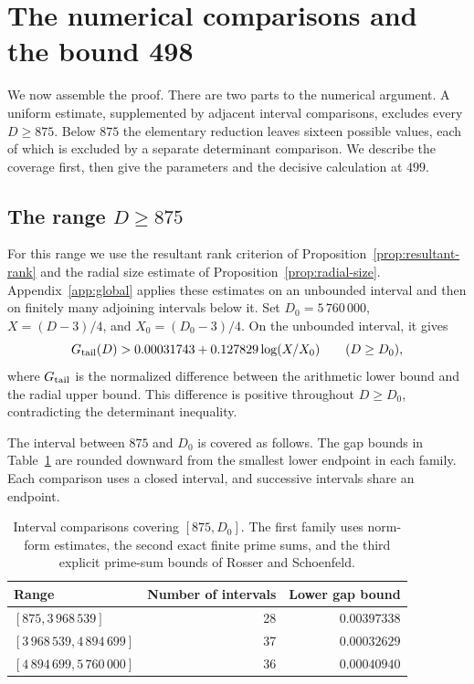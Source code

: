 \section{The numerical comparisons and the bound 498}\label{sec:completion}
We now assemble the proof. There are two parts to the numerical argument. A uniform estimate, supplemented by adjacent
interval comparisons, excludes every $D\geq875$. Below $875$ the elementary
reduction leaves sixteen possible values, each of which is excluded by a
separate determinant comparison. We describe the coverage first, then give
the parameters and the decisive calculation at $499$.

\subsection{The range \texorpdfstring{$D\geq875$}{D >= 875}}
For this range we use the resultant rank criterion of
Proposition~\ref{prop:resultant-rank} and the radial size estimate of
Proposition~\ref{prop:radial-size}. Appendix~\ref{app:global} applies these
estimates on an unbounded interval and then on finitely many adjoining
intervals below it. Set $D_0=5\,760\,000$, $X=(D-3)/4$, and
$X_0=(D_0-3)/4$. On the unbounded interval, it gives
\begin{equation}\label{eq:tail-gap}
 G_{\rm tail}(D)
 >0.00031743+0.127829\log(X/X_0)\qquad(D\geq D_0),
\end{equation}
where $G_{\rm tail}$ is the normalized difference between the arithmetic
lower bound and the radial upper bound. This difference is positive
throughout $D\geq D_0$, contradicting the determinant inequality.

The interval between $875$ and $D_0$ is covered as follows. The gap bounds in
Table~\ref{tab:coverage} are rounded downward from the smallest
lower endpoint in each family. Each comparison uses a closed interval, and
successive intervals share an endpoint.
\begin{table}[ht]
\centering
\begin{tabular}{lrr}
\toprule
Range & Number of intervals & Lower gap bound\\
\midrule
$[875,3\,968\,539]$ & 28 & $0.00397338$\\
$[3\,968\,539,4\,894\,699]$ & 37 & $0.00032629$\\
$[4\,894\,699,5\,760\,000]$ & 36 & $0.00040940$\\
\bottomrule
\end{tabular}
\caption{Interval comparisons covering $[875,D_0]$. The first
family uses norm-form estimates, the second exact finite prime sums, and the
third explicit prime-sum bounds of Rosser and Schoenfeld.}
\label{tab:coverage}
\end{table}

